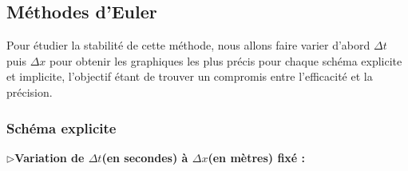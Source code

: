 \subsection{Méthodes d'Euler}

Pour étudier la stabilité de cette méthode, nous allons faire varier d'abord  $\Delta t$  puis $\Delta x$ pour obtenir les graphiques les plus précis pour chaque schéma explicite et implicite, l'objectif étant de trouver un compromis entre l'efficacité et la précision.

\subsubsection{Schéma explicite}

$\triangleright$\textbf{Variation de  $\Delta t$(en secondes) à $\Delta x$(en mètres) fixé :}\\

